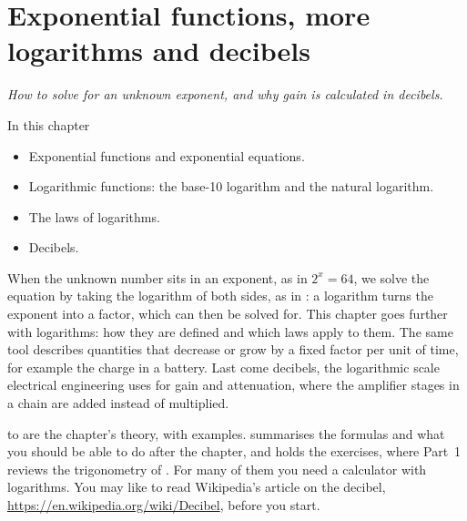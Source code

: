 
\chapter{Exponential functions, more logarithms and decibels}
\label{c10:ch}

{\large\itshape How to solve for an unknown exponent, and why gain is calculated in
decibels.\par}

\begin{chapterbox}{In this chapter}
\begin{itemize}
  \item Exponential functions and exponential equations.
  \item Logarithmic functions: the base-10 logarithm and the natural logarithm.
  \item The laws of logarithms.
  \item Decibels.
\end{itemize}
\end{chapterbox}

When the unknown number sits in an exponent, as in $2^x = 64$, we solve the equation by taking the
logarithm of both sides, as in : a logarithm turns the exponent into a
factor, which can then be solved for. This chapter goes further with logarithms: how they are
defined and which laws apply to them. The same tool describes quantities that
decrease or grow by a fixed factor per unit of time, for example the charge in a battery. Last
come decibels, the logarithmic scale electrical engineering uses for gain and attenuation, where
the amplifier stages in a chain are added instead of multiplied.

 to  are the chapter's theory, with
examples.  summarises the formulas and what you should be able to
do after the chapter, and  holds the exercises, where Part~1 reviews the
trigonometry of . For many of them you need a calculator with logarithms. You may like to
read Wikipedia's article on the decibel, \url{https://en.wikipedia.org/wiki/Decibel}, before you
start.




